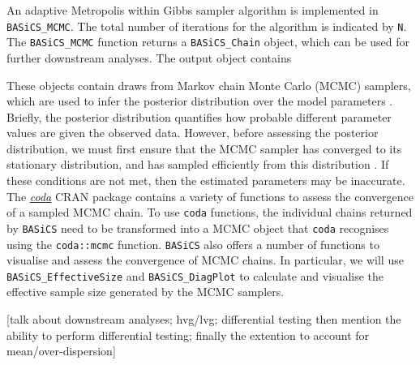 \documentclass[9pt,a4paper,]{extarticle}
\begin{document}
An adaptive Metropolis within Gibbs sampler \citep{Roberts2009} algorithm is
implemented in \texttt{BASiCS\_MCMC}.
The total number of iterations for the algorithm is indicated by \texttt{N}.
The \texttt{BASiCS\_MCMC} function returns a \texttt{BASiCS\_Chain} object, which can be used
for further downstream analyses.
The output object contains

These objects contain draws from Markov chain Monte Carlo (MCMC) samplers,
which are used to infer the posterior distribution over the model parameters
\citep{Smith1993}.
Briefly, the posterior distribution quantifies how probable different parameter
values are given the observed data. However, before assessing the posterior
distribution, we must first ensure that the MCMC sampler has converged to
its stationary distribution, and has sampled efficiently from this distribution
\citep{Cowles1996}. If these conditions are not met, then the estimated parameters
may be inaccurate. The \emph{\href{https://CRAN.R-project.org/package=coda}{coda}} CRAN package contains a variety of
functions to assess the convergence of a sampled MCMC chain.
To use \texttt{coda} functions, the individual chains returned by \texttt{BASiCS} need to be
transformed into a MCMC object that \texttt{coda} recognises using the \texttt{coda::mcmc}
function. \texttt{BASiCS} also offers a number of functions to visualise and assess the
convergence of MCMC chains. In particular, we will use
\texttt{BASiCS\_EffectiveSize} and \texttt{BASiCS\_DiagPlot} to calculate and visualise the
effective sample size generated by the MCMC samplers.

{[}talk about downstream analyses; hvg/lvg; differential testing
then mention the ability to perform differential testing;
finally the extention to account for mean/over-dispersion{]}

{\small}
\end{document}
